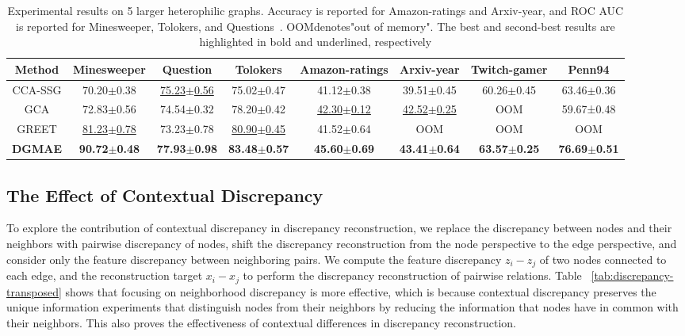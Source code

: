 \documentclass[sigconf]{acmart}
\begin{document}
\begin{table}

    \centering
\caption{Experimental results on 5 larger heterophilic graphs. Accuracy is reported for Amazon-ratings and Arxiv-year, and ROC AUC is reported for Minesweeper, Tolokers, and Questions~\cite{roman}. OOMdenotes"out of memory". The best and second-best results are highlighted in bold and
underlined, respectively}
    \begin{tabular}{c|ccccccc}
        \toprule
        Method  & Minesweeper & Question & Tolokers &  Amazon-ratings & Arxiv-year & Twitch-gamer & Penn94\\
        \midrule
        CCA-SSG &  70.20$\pm$0.38 & \underline{75.23$\pm$0.56} &  75.02$\pm$0.47 &41.12$\pm$0.38  & 39.51$\pm$0.45 &60.26$\pm$0.45&63.46$\pm$0.36\\
        GCA   & 72.83$\pm$0.56 & 74.54$\pm$0.32 & 78.20$\pm$0.42 &\underline{42.30$\pm$0.12} & \underline{42.52$\pm$0.25} &OOM & 59.67±0.48\\
        
        GREET   & \underline{81.23$\pm$0.78} & 73.23$\pm$0.78 & \underline{80.90$\pm$0.45} & 41.52$\pm$0.64 & OOM &OOM &OOM\\
        \textbf{DGMAE} & \textbf{90.72$\pm$0.48} & \textbf{77.93$\pm$0.98} & \textbf{83.48$\pm$0.57} & \textbf{45.60$\pm$0.69} & \textbf{43.41$\pm$0.64} &\textbf{63.57$\pm$0.25} & \textbf{76.69$\pm$0.51}\\  
        \bottomrule
    \end{tabular}
       \label{large_heter}
\end{table}


\subsection{The Effect of Contextual Discrepancy}
 To explore the contribution of contextual discrepancy in discrepancy reconstruction, we replace the discrepancy between nodes and their neighbors with pairwise discrepancy of nodes, shift the discrepancy reconstruction from the node perspective to the edge perspective, and consider only the feature discrepancy between neighboring pairs. We compute the feature discrepancy $z_i-z_j$ of two nodes connected to each edge, and the reconstruction target $x_i-x_j$ to perform the discrepancy reconstruction of pairwise relations. Table ~\ref{tab:discrepancy-transposed} shows that focusing on neighborhood discrepancy is more effective, which is because contextual discrepancy preserves the unique information experiments that distinguish nodes from their neighbors by reducing the information that nodes have in common with their neighbors. This also proves the effectiveness of contextual differences in discrepancy reconstruction.
 
\end{document}
